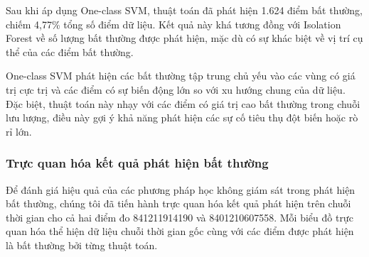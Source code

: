 Sau khi áp dụng One-class SVM, thuật toán đã phát hiện 1.624 điểm bất thường, chiếm 4,77\% tổng số điểm dữ liệu. Kết quả này khá tương đồng với Isolation Forest về số lượng bất thường được phát hiện, mặc dù có sự khác biệt về vị trí cụ thể của các điểm bất thường.

One-class SVM phát hiện các bất thường tập trung chủ yếu vào các vùng có giá trị cực trị và các điểm có sự biến động lớn so với xu hướng chung của dữ liệu. Đặc biệt, thuật toán này nhạy với các điểm có giá trị cao bất thường trong chuỗi lưu lượng, điều này gợi ý khả năng phát hiện các sự cố tiêu thụ đột biến hoặc rò rỉ lớn.

\subsubsection{Trực quan hóa kết quả phát hiện bất thường}

Để đánh giá hiệu quả của các phương pháp học không giám sát trong phát hiện bất thường, chúng tôi đã tiến hành trực quan hóa kết quả phát hiện trên chuỗi thời gian cho cả hai điểm đo 841211914190 và 8401210607558. Mỗi biểu đồ trực quan hóa thể hiện dữ liệu chuỗi thời gian gốc cùng với các điểm được phát hiện là bất thường bởi từng thuật toán.

